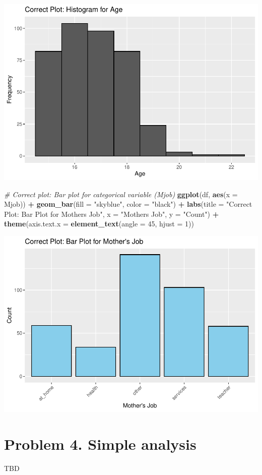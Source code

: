 \documentclass[
  11pt,
]{article}
\newenvironment{Shaded}{\begin{snugshade}}{\end{snugshade}}
\newcommand{\AttributeTok}[1]{\textcolor[rgb]{0.13,0.29,0.53}{#1}}
\newcommand{\CommentTok}[1]{\textcolor[rgb]{0.56,0.35,0.01}{\textit{#1}}}
\newcommand{\DecValTok}[1]{\textcolor[rgb]{0.00,0.00,0.81}{#1}}
\newcommand{\FunctionTok}[1]{\textcolor[rgb]{0.13,0.29,0.53}{\textbf{#1}}}
\newcommand{\NormalTok}[1]{#1}
\newcommand{\SpecialCharTok}[1]{\textcolor[rgb]{0.81,0.36,0.00}{\textbf{#1}}}
\newcommand{\StringTok}[1]{\textcolor[rgb]{0.31,0.60,0.02}{#1}}
\begin{document}
\includegraphics{figs/unnamed-chunk-6.pdf}

\begin{Shaded}
\begin{Highlighting}[]
\CommentTok{\# Correct plot: Bar plot for categorical variable (Mjob)}
\FunctionTok{ggplot}\NormalTok{(df, }\FunctionTok{aes}\NormalTok{(}\AttributeTok{x =}\NormalTok{ Mjob)) }\SpecialCharTok{+}
  \FunctionTok{geom\_bar}\NormalTok{(}\AttributeTok{fill =} \StringTok{"skyblue"}\NormalTok{, }\AttributeTok{color =} \StringTok{"black"}\NormalTok{) }\SpecialCharTok{+}
  \FunctionTok{labs}\NormalTok{(}\AttributeTok{title =} \StringTok{"Correct Plot: Bar Plot for Mother\textquotesingle{}s Job"}\NormalTok{, }\AttributeTok{x =} \StringTok{"Mother\textquotesingle{}s Job"}\NormalTok{, }\AttributeTok{y =} \StringTok{"Count"}\NormalTok{) }\SpecialCharTok{+}
  \FunctionTok{theme}\NormalTok{(}\AttributeTok{axis.text.x =} \FunctionTok{element\_text}\NormalTok{(}\AttributeTok{angle =} \DecValTok{45}\NormalTok{, }\AttributeTok{hjust =} \DecValTok{1}\NormalTok{))}
\end{Highlighting}
\end{Shaded}

\includegraphics{figs/unnamed-chunk-7.pdf}

\section{Problem 4. Simple analysis}\label{problem-4.-simple-analysis}

TBD
\end{document}
